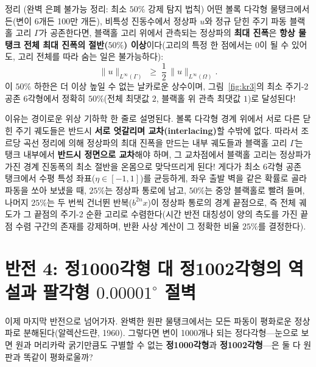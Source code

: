 \documentclass[11pt,a4paper]{article}
\begin{document}
\begin{wowbox}{정리 (완벽 은폐 불가능 정리: 최소 $50\%$ 강제 탐지 법칙)}
어떤 볼록 다각형 물탱크에서든(변이 6개든 100만 개든), 비특성 진동수에서 정상파 $u$와 정규 닫힌 주기 파동 블랙홀 고리 $\Gamma$가 공존한다면, 블랙홀 고리 위에서 관측되는 정상파의 \textbf{최대 진폭}은 \textbf{항상 물탱크 전체 최대 진폭의 절반($50\%$) 이상}이다(고리의 특정 한 점에서는 $0$이 될 수 있어도, 고리 전체를 따라 숨는 일은 불가능하다):
\[
  \|u\|_{L^\infty(\Gamma)} \;\ge\; \frac{1}{2}\,\|u\|_{L^\infty(\Omega)}.
\]
이 $50\%$ 하한은 더 이상 높일 수 없는 날카로운 상수이며, 그림~\ref{fig:kr3}의 최소 주기-2 공존 6각형에서 정확히 $50\%$(전체 최댓값 $2$, 블랙홀 위 관측 최댓값 $1$)로 달성된다!
\end{wowbox}

이유는 경이로운 위상 기하학 한 줄로 설명된다. 볼록 다각형 경계 위에서 서로 다른 닫힌 주기 궤도들은 반드시 \textbf{서로 엇갈리며 교차(interlacing)}할 수밖에 없다. 따라서 조르당 곡선 정리에 의해 정상파의 최대 진폭을 만드는 내부 궤도들과 블랙홀 고리 $\Gamma$는 탱크 내부에서 \textbf{반드시 정면으로 교차}해야 하며, 그 교차점에서 블랙홀 고리는 정상파가 가진 경계 진동폭의 최소 절반을 온몸으로 맞닥뜨리게 된다! 게다가 최소 6각형 공존 탱크에서 수평 특성 좌표($\eta \in [-1,1]$)를 균등하게, 좌우 출발 벽을 같은 확률로 골라 파동을 쏘아 보냈을 때, $25\%$는 정상파 통로에 남고, $50\%$는 중앙 블랙홀로 빨려 들며, 나머지 $25\%$는 두 번씩 건너뛴 반복($b^{2n}x$)이 정상파 통로의 경계 끝점으로, 즉 전체 궤도가 그 끝점의 주기-2 순환 고리로 수렴한다(시간 반전 대칭성이 양의 측도를 가진 끝점 수렴 구간의 존재를 강제하며, 반환 사상 계산이 그 정확한 비율 $25\%$를 결정한다).

\section{반전 4: 정1000각형 대 정1002각형의 역설과 팔각형 \texorpdfstring{$0.00001^\circ$}{0.00001도} 절벽}

이제 마지막 반전으로 넘어가자. 완벽한 원판 물탱크에서는 모든 파동이 평화로운 정상파로 분해된다(알렉산드랸, 1960). 그렇다면 변이 1000개나 되는 정다각형---눈으로 보면 원과 머리카락 굵기만큼도 구별할 수 없는 \textbf{정1000각형}과 \textbf{정1002각형}---은 둘 다 원판과 똑같이 평화로울까?
\end{document}
